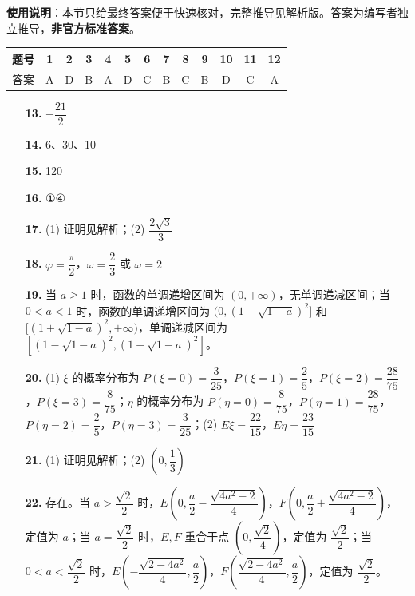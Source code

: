 
\begin{gknotice}
\textbf{使用说明}：本节只给最终答案便于快速核对，完整推导见解析版。答案为编写者独立推导，\textbf{非官方标准答案}。
\end{gknotice}

\begin{center}\begin{tabular}{ccccccccccccc}
\toprule
题号 & 1 & 2 & 3 & 4 & 5 & 6 & 7 & 8 & 9 & 10 & 11 & 12 \\
\midrule
答案 & A & D & B & A & D & C & B & C & B & D & C & A \\
\bottomrule
\end{tabular}\end{center}

\begin{itemize}[leftmargin=2.6em]
  \item[\textbf{13.}] $-\dfrac{21}{2}$
  \item[\textbf{14.}] 6、30、10
  \item[\textbf{15.}] 120
  \item[\textbf{16.}] ①④
\end{itemize}

\begin{itemize}[leftmargin=2.6em]
  \item[\textbf{17.}] (1) 证明见解析；(2) $\dfrac{2\sqrt{3}}{3}$
  \item[\textbf{18.}] $\varphi = \dfrac{\pi}{2}$，$\omega = \dfrac{2}{3}$ 或 $\omega = 2$
  \item[\textbf{19.}] 当 $a \ge 1$ 时，函数的单调递增区间为 $(0, +\infty)$，无单调递减区间；当 $0 < a < 1$ 时，函数的单调递增区间为 $(0, (1-\sqrt{1-a})^2]$ 和 $[(1+\sqrt{1-a})^2, +\infty)$，单调递减区间为 $[(1-\sqrt{1-a})^2, (1+\sqrt{1-a})^2]$。
  \item[\textbf{20.}] (1) $\xi$ 的概率分布为 $P(\xi=0)=\dfrac{3}{25}$，$P(\xi=1)=\dfrac{2}{5}$，$P(\xi=2)=\dfrac{28}{75}$，$P(\xi=3)=\dfrac{8}{75}$；$\eta$ 的概率分布为 $P(\eta=0)=\dfrac{8}{75}$，$P(\eta=1)=\dfrac{28}{75}$，$P(\eta=2)=\dfrac{2}{5}$，$P(\eta=3)=\dfrac{3}{25}$；(2) $E\xi = \dfrac{22}{15}$，$E\eta = \dfrac{23}{15}$
  \item[\textbf{21.}] (1) 证明见解析；(2) $\left(0, \dfrac{1}{3}\right)$
  \item[\textbf{22.}] 存在。当 $a > \dfrac{\sqrt{2}}{2}$ 时，$E\left(0, \dfrac{a}{2} - \dfrac{\sqrt{4a^2 - 2}}{4}\right)$，$F\left(0, \dfrac{a}{2} + \dfrac{\sqrt{4a^2 - 2}}{4}\right)$，定值为 $a$；当 $a = \dfrac{\sqrt{2}}{2}$ 时，$E, F$ 重合于点 $\left(0, \dfrac{\sqrt{2}}{4}\right)$，定值为 $\dfrac{\sqrt{2}}{2}$；当 $0 < a < \dfrac{\sqrt{2}}{2}$ 时，$E\left(-\dfrac{\sqrt{2 - 4a^2}}{4}, \dfrac{a}{2}\right)$，$F\left(\dfrac{\sqrt{2 - 4a^2}}{4}, \dfrac{a}{2}\right)$，定值为 $\dfrac{\sqrt{2}}{2}$。
\end{itemize}
